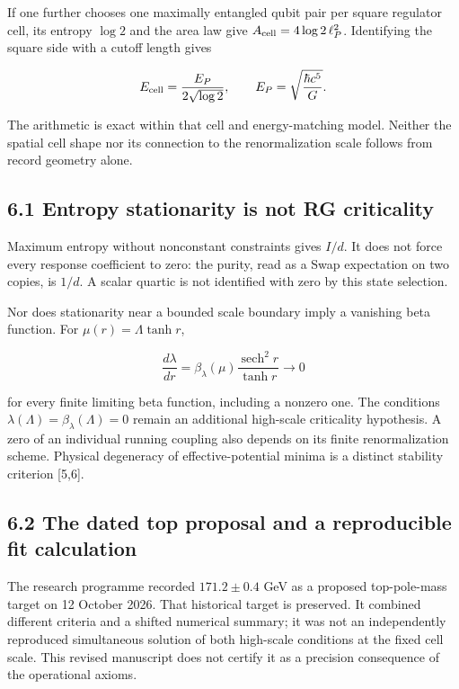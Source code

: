 \documentclass[
  11pt,
  a4paper,
]{article}
\begin{document}
If one further chooses one maximally entangled qubit pair per square regulator cell, its entropy \(\log2\) and the area law give \(A_{\rm cell}=4\log2\,\ell_P^2\). Identifying the square side with a cutoff length gives

\[E_{\rm cell}=\frac{E_P}{2\sqrt{\log2}},\qquad E_P=\sqrt{\frac{\hbar c^5}{G}}.\]

The arithmetic is exact within that cell and energy-matching model. Neither the spatial cell shape nor its connection to the renormalization scale follows from record geometry alone.

\subsection{6.1 Entropy stationarity is not RG criticality}\label{entropy-stationarity-is-not-rg-criticality}

Maximum entropy without nonconstant constraints gives \(I/d\). It does not force every response coefficient to zero: the purity, read as a Swap expectation on two copies, is \(1/d\). A scalar quartic is not identified with zero by this state selection.

Nor does stationarity near a bounded scale boundary imply a vanishing beta function. For \(\mu(r)=\Lambda\tanh r\),

\[\frac{d\lambda}{dr}=\beta_\lambda(\mu)
\frac{\operatorname{sech}^2r}{\tanh r}\longrightarrow0\]

for every finite limiting beta function, including a nonzero one. The conditions \(\lambda(\Lambda)=\beta_\lambda(\Lambda)=0\) remain an additional high-scale criticality hypothesis. A zero of an individual running coupling also depends on its finite renormalization scheme. Physical degeneracy of effective-potential minima is a distinct stability criterion {[}5,6{]}.

\subsection{6.2 The dated top proposal and a reproducible fit calculation}\label{the-dated-top-proposal-and-a-reproducible-fit-calculation}

The research programme recorded \(171.2\pm0.4\) GeV as a proposed top-pole-mass target on 12 October 2026. That historical target is preserved. It combined different criteria and a shifted numerical summary; it was not an independently reproduced simultaneous solution of both high-scale conditions at the fixed cell scale. This revised manuscript does not certify it as a precision consequence of the operational axioms.
\end{document}
